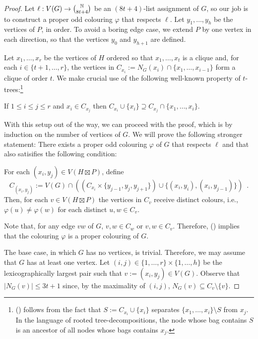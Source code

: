 \documentclass{patmorin}
\begin{document}
\begin{proof}
  Let $\ell:V(G)\to\binom{\mathbb{N}}{8t+4}$ be an $(8t+4)$-list assignment of $G$, so our job is to construct a proper odd colouring $\varphi$ that respects $\ell$.  Let $y_1,\ldots,y_h$ be the vertices of $P$, in order.  To avoid a boring edge case, we extend $P$ by one vertex in each direction, so that the vertices $y_0$ and $y_{h+1}$ are defined.

  Let $x_1,\ldots,x_r$ be the vertices of $H$ ordered so that $x_1,\ldots,x_{t}$ is a clique and, for each $i\in\{t+1,\ldots,r\}$, the vertices in $C_{x_i}:=N_G(x_i)\cap\{x_1,\ldots,x_{i-1}\}$ form a clique of order $t$.  We make crucial use of the following well-known property of $t$-trees:\footnote{() follows from the fact that $S:=C_{x_i}\cup\{x_i\}$ separates $\{x_1,\ldots,x_i\}\setminus S$ from $x_{j}$.  In the language of rooted tree-decompositions, the node whose bag contains $S$ is an ancestor of all nodes whose bags contains $x_{j}$.}
  \begin{compactitem}[(\ding{74})]
    \item If $1\le i \le j\le r$ and $x_i \in C_{x_{j}}$ then $C_{x_i}\cup\{x_i\}\supseteq C_{x_{j}}\cap\{x_1,\ldots,x_{i}\}$.
  \end{compactitem}

  With this setup out of the way, we can proceed with the proof, which is by induction on the number of vertices of $G$.  We will prove the following stronger statement:  There exists a proper odd colouring $\varphi$ of $G$ that respects $\ell$ and that also satisifies the following condition:
  \begin{compactitem}[(\ding{96})]
    \item For each $(x_i,y_j)\in V(H\boxtimes P)$, define
    \[
      C_{(x_i,y_j)}:=V(G)\cap \left(\left(C_{x_i}\times\{y_{j-1}, y_{j},y_{j+1}\}\right)\cup\{(x_i,y_i),(x_i,y_{j-1})\}\right)
      \enspace .
    \]
    Then, for each $v\in V(H\boxtimes P)$ the vertices in $C_v$ receive distinct colours, i.e., $\varphi(u)\neq \varphi(w)$ for each distinct $u,w\in C_v$.
  \end{compactitem}
  Note that, for any edge $vw$ of $G$, $v,w \in C_w$ or $v,w\in C_v$.  Therefore, () implies that the colouring $\varphi$ is a proper colouring of $G$.

  The base case, in which $G$ has no vertices, is trivial. Therefore, we may assume that $G$ has at least one vertex.  Let $(i,j)\in\{1,\ldots,r\}\times\{1,\ldots,h\}$ be the lexicographically largest pair such that $v:=(x_i,y_j)\in V(G)$.  Observe that $|N_G(v)|\le 3t+1$ since, by the maximality of $(i,j)$,  $N_G(v)\subseteq C_v\setminus\{v\}$.


\end{proof}
\end{document}
